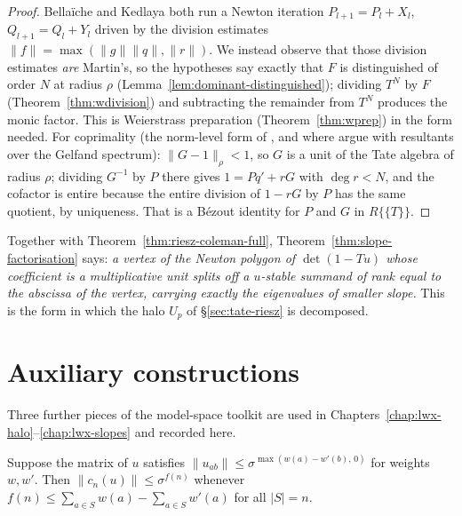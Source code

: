 \begin{proof}
  \leanok
  Bella\"iche and Kedlaya \cite[Proposition 3.2.2]{Kedlaya} both run a Newton iteration
  $P_{l+1} = P_l + X_l$, $Q_{l+1} = Q_l + Y_l$ driven by the division estimates
  $\lVert f\rVert = \max(\lVert g\rVert\lVert q\rVert, \lVert r\rVert)$.  We instead observe that
  those division estimates \emph{are} Martin's, so the hypotheses say exactly that $F$ is
  distinguished of order $N$ at radius $\rho$ (Lemma~\ref{lem:dominant-distinguished}); dividing
  $T^N$ by $F$ (Theorem~\ref{thm:wdivision}) and subtracting the remainder from $T^N$ produces
  the monic factor.  This is Weierstrass preparation (Theorem~\ref{thm:wprep}) in the form
  needed.  For coprimality (the norm-level form of \cite[Lemma 2.2.7]{JN}, and where \cite{JN}
  argue with resultants over the Gelfand spectrum): $\lVert G-1\rVert_\rho < 1$, so $G$ is a unit
  of the Tate algebra of radius $\rho$; dividing $G^{-1}$ by $P$ there gives
  $1 = Pq' + rG$ with $\deg r < N$, and the cofactor is entire because the entire division of
  $1 - rG$ by $P$ has the same quotient, by uniqueness.  That is a B\'ezout identity for $P$ and
  $G$ in $R\{\{T\}\}$.
\end{proof}

Together with Theorem~\ref{thm:riesz-coleman-full}, Theorem~\ref{thm:slope-factorisation} says:
\emph{a vertex of the Newton polygon of $\det(1-Tu)$ whose coefficient is a multiplicative unit
splits off a $u$-stable summand of rank equal to the abscissa of the vertex, carrying exactly
the eigenvalues of smaller slope.}  This is the form in which the halo $U_p$ of
\S\ref{sec:tate-riesz} is decomposed.

\section{Auxiliary constructions}

Three further pieces of the model-space toolkit are used in
Chapters~\ref{chap:lwx-halo}--\ref{chap:lwx-slopes} and recorded here.

\begin{lemma}
  \label{lem:two-sided}
  \leanok
  Suppose the matrix of $u$ satisfies $\lVert u_{ab}\rVert \leq \sigma^{\max(w(a) - w'(b),\,0)}$
  for weights $w, w'$.  Then $\lVert c_n(u)\rVert \leq \sigma^{f(n)}$ whenever
  $f(n) \leq \sum_{a\in S} w(a) - \sum_{a \in S} w'(a)$ for all $\lvert S\rvert = n$.
\end{lemma}

